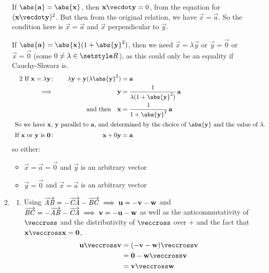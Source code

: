 \documentclass[fleqn,a4paper,11pt]{article}
\begin{document}
\begin{enumerate}
    If \(\abs{\vec a} = \abs{\vec x}\), then \(\vec x \vecdot \vec y = 0\), from
    the equation for \((\vec x \vecdot \vec y)^2\). But then from the original
    relation, we have \(\vec x = \vec a\). So the condition here is
    \(\vec x = \vec a\) and \(\vec x\) perpendicular to \(\vec y\).

    If \(\abs{\vec a} = \abs{\vec x}(1 + \abs{\vec y}^2)\), then we need
    \(\vec x = \lambda \vec y\) or \(\vec y = \vec 0\) or \(\vec x = \vec 0\)
    (some \(0 \ne \lambda \in \Reals\)), as this
    could only be an equality if Cauchy-Shwarz is.
    \begin{alignat*}2
     \text{
      If \(\vec x = \lambda \vec y\)}\colon
          && \quad \lambda \vec y + \vec y (\lambda \abs{\vec y}^2) &= \vec a \\
     \implies{}&& \vec y &= \frac 1{\lambda(1 + \abs{\vec y}^2)}\,\vec a \\
     && \text{and then} \quad \vec x &=
             \frac 1{1 + \abs{\vec y}^2}\,\vec a \\
     \intertext{
      So we have \(\vec x\), \(\vec y\) parallel to \(\vec a\), and determined
      by the choice of \(\abs{\vec y}\) and the value of \(\lambda\).}
     \text{
      If \(\vec x\) or \(\vec y\) is \(\vec 0\)}\colon
     && \quad \vec x + 0\vec y &= \vec a
    \end{alignat*}
    so either:
    \begin{itemize}
     \item \(\vec x = \vec a = \vec 0\) and \(\vec y\) is an arbitrary vector
     \item \(\vec y = \vec 0\) and \(\vec x = \vec a\) is an arbitrary vector
    \end{itemize}
   \item
    \begin{enumerate}
     \item
      Using
      \(\overrightarrow{\mathit{AB}} = -\overrightarrow{\mathit{CA}} - \overrightarrow{\mathit{BC}} \implies \mathrm{\mathbf{u}} = -\mathrm{\mathbf{v}} - \mathrm{\mathbf{w}}\)
      and
      \(\overrightarrow{\mathit{BC}} = -\overrightarrow{\mathit{AB}} - \overrightarrow{\mathit{CA}} \implies \mathrm{\mathbf{v}} = -\mathrm{\mathbf{u}} - \mathrm{\mathbf{w}}\)
      as well as the anticommutativity of \(\veccross\) and the distributivity
      of \(\veccross\) over \(+\) and the fact that
      \(\vec x \veccross \vec x = \vec 0\),
      \begin{align*}
       \vec u \veccross \vec v &= (-\vec v - \vec w) \veccross \vec v \\
                               &= \vec 0 - \vec w \veccross \vec v \\
                               &= \vec v \veccross \vec w \\

\end{align*}
\end{enumerate}
\end{enumerate}
\end{document}
